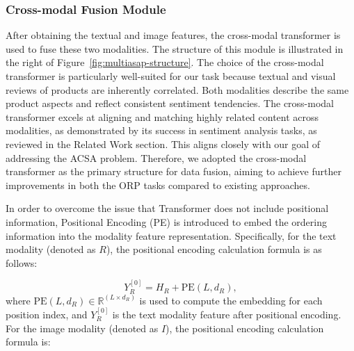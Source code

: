 \documentclass[preprint,12pt]{elsarticle}
\begin{document}
\subsubsection{Cross-modal Fusion Module}


After obtaining the textual and image features, the cross-modal transformer is used to fuse these two modalities. The structure of this module is illustrated in the right of Figure~\ref{fig:multiasap-structure}. The choice of the cross-modal transformer is particularly well-suited for our task because textual and visual reviews of products are inherently correlated. Both modalities describe the same product aspects and reflect consistent sentiment tendencies. The cross-modal transformer excels at aligning and matching highly related content across modalities, as demonstrated by its success in sentiment analysis tasks, as reviewed in the Related Work section. This aligns closely with our goal of addressing the ACSA problem. Therefore, we adopted the cross-modal transformer as the primary structure for data fusion, aiming to achieve further improvements in both the ORP tasks compared to existing approaches.

In order to overcome the issue that Transformer does not include positional information, Positional Encoding (PE) is introduced to embed the ordering information into the modality feature representation. Specifically, for the text modality (denoted as $R$), the positional encoding calculation formula is as follows:

\begin{equation}
Y_R^{[0]} = H_R + \text{PE}(L, d_R),
\end{equation}
where $\text{PE}(L, d_R) \in \mathbb{R}^{(L \times d_R)}$ is used to compute the embedding for each position index, and $Y_R^{[0]}$ is the text modality feature after positional encoding. For the image modality (denoted as $I$), the positional encoding calculation formula is:
\end{document}
